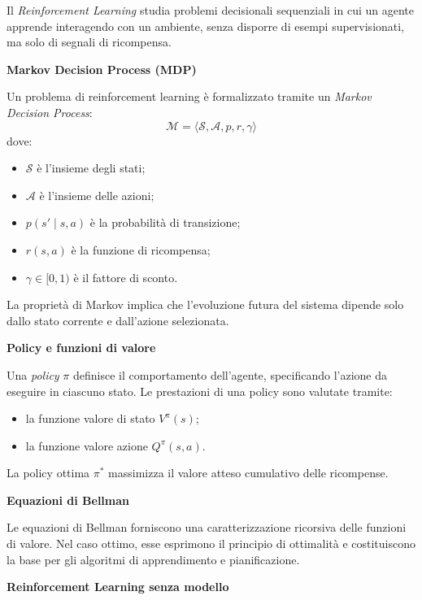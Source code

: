 \documentclass[a4paper,12pt]{report}
\begin{document}
\begin{tcolorbox}[
  colback=green!10!white,
  colframe=green!50!black,
  coltitle=white,
  title=\textbf{Reinforcement Learning – Concetti chiave},
  fonttitle=\bfseries,
  breakable
]

Il \emph{Reinforcement Learning} studia problemi decisionali sequenziali in cui
un agente apprende interagendo con un ambiente, senza disporre di esempi
supervisionati, ma solo di segnali di ricompensa.

\medskip
\textbf{Markov Decision Process (MDP)}

Un problema di reinforcement learning è formalizzato tramite un
\emph{Markov Decision Process}:
\[
\mathcal{M} = \langle \mathcal{S}, \mathcal{A}, p, r, \gamma \rangle
\]
dove:
\begin{itemize}
\item $\mathcal{S}$ è l’insieme degli stati;
\item $\mathcal{A}$ è l’insieme delle azioni;
\item $p(s' \mid s,a)$ è la probabilità di transizione;
\item $r(s,a)$ è la funzione di ricompensa;
\item $\gamma \in [0,1)$ è il fattore di sconto.
\end{itemize}

La proprietà di Markov implica che l’evoluzione futura del sistema dipende
solo dallo stato corrente e dall’azione selezionata.

\medskip
\textbf{Policy e funzioni di valore}

Una \emph{policy} $\pi$ definisce il comportamento dell’agente, specificando
l’azione da eseguire in ciascuno stato.
Le prestazioni di una policy sono valutate tramite:
\begin{itemize}
\item la funzione valore di stato $V^\pi(s)$;
\item la funzione valore azione $Q^\pi(s,a)$.
\end{itemize}

La policy ottima $\pi^*$ massimizza il valore atteso cumulativo delle ricompense.

\medskip
\textbf{Equazioni di Bellman}

Le equazioni di Bellman forniscono una caratterizzazione ricorsiva delle funzioni
di valore.
Nel caso ottimo, esse esprimono il principio di ottimalità e costituiscono la base
per gli algoritmi di apprendimento e pianificazione.

\medskip
\textbf{Reinforcement Learning senza modello}


\end{tcolorbox}
\end{document}
